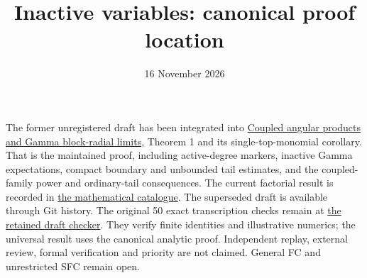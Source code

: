 \documentclass[11pt]{article}
\title{Inactive variables: canonical proof location}
\date{16 November 2026}
\begin{document}
\maketitle
The former unregistered draft has been integrated into
\href{../../factorial/image-rigidity/COUPLED_BLOCK_PERIODS.tex}
{Coupled angular products and Gamma block-radial limits},
Theorem 1 and its single-top-monomial corollary. That is the maintained
proof, including active-degree markers, inactive Gamma expectations,
compact boundary and unbounded tail estimates, and the coupled-family
power and ordinary-tail consequences. The current factorial result is
recorded in \href{../../MATH_STATUS.json}{the mathematical catalogue}.
The superseded draft is available through Git history.
The original 50 exact transcription checks remain at
\href{check_inactive_variable_factorial_extension_20261116.py}
{the retained draft checker}. They verify finite identities and illustrative
numerics; the universal result uses the canonical analytic proof.
Independent replay, external review, formal verification and priority
are not claimed. General FC and unrestricted SFC remain open.
\end{document}

